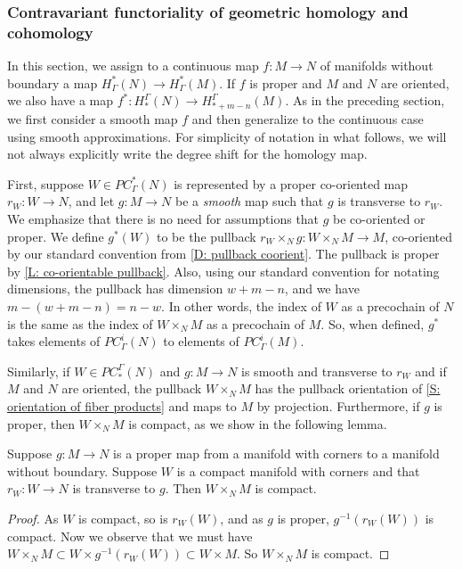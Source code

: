 \subsubsection{Contravariant functoriality of geometric homology and cohomology}\label{S: cohomology pullback}

In this section, we assign to a continuous map $f \colon M \to N$ of manifolds without boundary a map $H^*_\Gamma(N) \to H^*_\Gamma(M)$.
If $f$ is proper and $M$ and $N$ are oriented, we also have a map $f^* \colon H_*^\Gamma(N) \to H_{*+m-n}^\Gamma(M)$.
As in the preceding section, we first consider a smooth map $f$ and then generalize to the continuous case using smooth approximations.
For simplicity of notation in what follows, we will not always explicitly write the degree shift for the homology map.

First, suppose $W \in PC^*_\Gamma(N)$ is represented by a proper co-oriented map $r_W \colon W \to N$, and let $g \colon M \to N$ be a \textit{smooth} map such that $g$ is transverse to $r_W$.
We emphasize that there is no need for assumptions that $g$ be co-oriented or proper.
We define $g^*(W)$ to be the pullback $r_W \times_N g \colon W \times_N M \to M$, co-oriented by our standard convention from \cref{D: pullback coorient}.
The pullback is proper by \cref{L: co-orientable pullback}.
Also, using our standard convention for notating dimensions, the pullback has dimension $w+m-n$, and we have $m - (w+m-n) = n - w$. In other words, the index of $W$ as a precochain of $N$ is the same as the index of $W \times_N M$ as a precochain of $M$.
So, when defined, $g^*$ takes elements of $PC_\Gamma^i(N)$ to elements of $PC_\Gamma^i(M)$.

Similarly, if $W \in PC_*^\Gamma(N)$ and $g \colon M \to N$ is smooth and transverse to $r_W$ and if $M$ and $N$ are oriented, the pullback $W \times_N M$ has the pullback orientation of \cref{S: orientation of fiber products} and maps to $M$ by projection.
Furthermore, if $g$ is proper, then $W \times_N M$ is compact, as we show in the following lemma.

\begin{lemma}\label{L: compact pullback}
	Suppose $g \colon M \to N$ is a proper map from a manifold with corners to a manifold without boundary.
	Suppose $W$ is a compact manifold with corners and that $r_W \colon W \to N$ is transverse to $g$.
	Then $W \times_N M$ is compact.
\end{lemma}

\begin{proof}
	As $W$ is compact, so is $r_W(W)$, and as $g$ is proper, $g^{-1}(r_W(W))$ is compact.
	Now we observe that we must have $W \times_N M \subset W \times g^{-1}(r_W(W)) \subset W \times M$.
	So $W \times_N M$ is compact.
\end{proof}

